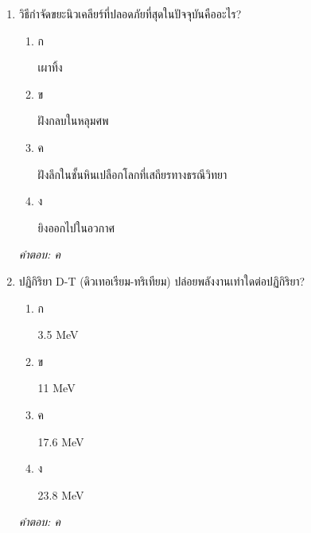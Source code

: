 \documentclass[12pt]{article}
\begin{document}
\begin{enumerate}[label=\arabic*., itemsep=0.5\baselineskip, topsep=0.5\baselineskip, leftmargin=*]
\item วิธีกำจัดขยะนิวเคลียร์ที่ปลอดภัยที่สุดในปัจจุบันคืออะไร?
\begin{enumerate}[label=\alph*)., itemsep=0.3\baselineskip, topsep=0.3\baselineskip]
\item ก\ 
\begin{minipage}[t]{0.9\linewidth}
\raggedright เผาทิ้ง
\end{minipage}
\item ข\ 
\begin{minipage}[t]{0.9\linewidth}
\raggedright ฝังกลบในหลุมศพ
\end{minipage}
\item ค\ 
\begin{minipage}[t]{0.9\linewidth}
\raggedright ฝังลึกในชั้นหินเปลือกโลกที่เสถียรทางธรณีวิทยา
\end{minipage}
\item ง\ 
\begin{minipage}[t]{0.9\linewidth}
\raggedright ยิงออกไปในอวกาศ
\end{minipage}
\end{enumerate}
\vspace{-0.3\baselineskip}
\begin{small}
\textit{คำตอบ: ค}
\end{small}

\item ปฏิกิริยา D-T (ดิวเทอเรียม-ทริเทียม) ปล่อยพลังงานเท่าใดต่อปฏิกิริยา?
\begin{enumerate}[label=\alph*)., itemsep=0.3\baselineskip, topsep=0.3\baselineskip]
\item ก\ 
\begin{minipage}[t]{0.9\linewidth}
\raggedright 3.5 MeV
\end{minipage}
\item ข\ 
\begin{minipage}[t]{0.9\linewidth}
\raggedright 11 MeV
\end{minipage}
\item ค\ 
\begin{minipage}[t]{0.9\linewidth}
\raggedright 17.6 MeV
\end{minipage}
\item ง\ 
\begin{minipage}[t]{0.9\linewidth}
\raggedright 23.8 MeV
\end{minipage}
\end{enumerate}
\vspace{-0.3\baselineskip}
\begin{small}
\textit{คำตอบ: ค}
\end{small}


\end{enumerate}
\end{document}
